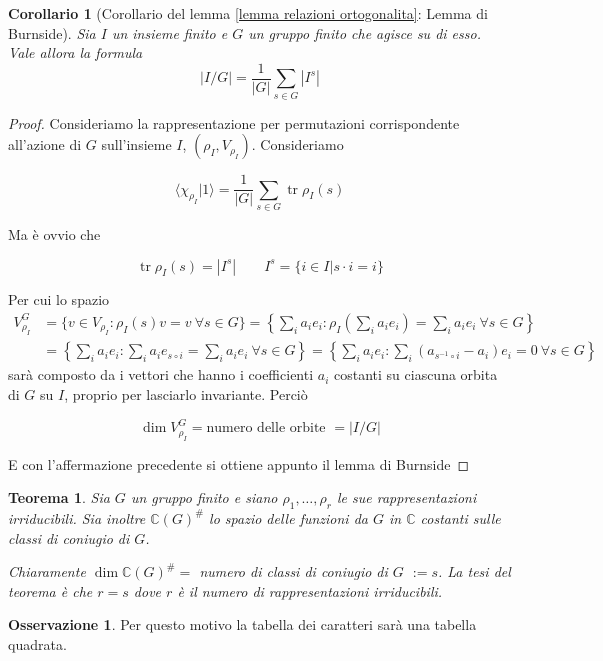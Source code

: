 \documentclass[11pt]{article}
\theoremstyle{plain}
\newtheorem{thm}{Teorema}[section]
\newtheorem*{cor}{Corollario}
\theoremstyle{definition}
\newtheorem*{rem}{Osservazione}
\theoremstyle{remark}
\newcommand{\C}{\mathbb{C}}
\newcommand{\dsum}{\displaystyle\sum}
\DeclareMathOperator{\tr}{tr}
\begin{document}
\begin{cor}[Corollario del lemma \ref{lemma relazioni ortogonalita}: Lemma di Burnside]

Sia $I$ un insieme finito e $G$ un gruppo finito che agisce su di esso. Vale allora la formula
\[ |I/G| = \dfrac{1}{|G|} \dsum_{s\in G} |I^s|\]
\end{cor}

\begin{proof}

Consideriamo la rappresentazione per permutazioni corrispondente all'azione di $G$ sull'insieme $I$, $(\rho_I, V_{\rho_I})$. Consideriamo

\[\langle \chi_{\rho_I} | 1 \rangle = \dfrac{1}{|G|} \dsum_{s\in G} \tr \rho_I(s)\]

Ma è ovvio che

\[\tr \rho_I(s) = |I^s| \qquad I^s = \{ i \in I | s \cdot i = i\} \]

Per cui lo spazio
\begin{align*}
V_{\rho_I}^G &= \{v\in V_{\rho_I}:\rho_I(s)v=v\  \forall s\in G\} = \left\{\sum_i a_i e_i :\rho_I\left(\sum_i a_i e_i\right)=\sum_i a_i e_i\ \forall s\in G \right\} \\
&=\left\{\sum_i a_i e_i :\sum_i a_i e_{s\circ i}=\sum_i a_i e_i\ \forall s\in G \right\}= \left\{ \sum_i a_i e_i: \sum_i (a_{s^{-1}\circ i}-a_i)e_i=0\ \forall s\in G \right\}
\end{align*}
sarà composto da i vettori che hanno i coefficienti $a_i$ costanti su ciascuna orbita di $G$ su $I$, proprio per lasciarlo invariante. Perciò

\[ \dim V_{\rho_I}^G = \text{numero delle orbite } = |I/G|\]

E con l'affermazione precedente si ottiene appunto il lemma di Burnside
\end{proof}



\begin{thm} Sia $G$ un gruppo finito e siano $\rho_1, \ldots , \rho_r$ le sue rappresentazioni irriducibili. Sia inoltre $\C(G)^{\#}$ lo spazio delle funzioni da $G$ in $\C$ costanti sulle classi di coniugio di $G$.

Chiaramente $\dim \C(G)^\# = $ numero di classi di coniugio di $G$ $:= s$. La tesi del teorema è che $r = s$ dove $r$ è il numero di rappresentazioni irriducibili.
\end{thm}


\begin{rem}
 Per questo motivo la tabella dei caratteri sarà una tabella quadrata.
\end{rem}
\end{document}

